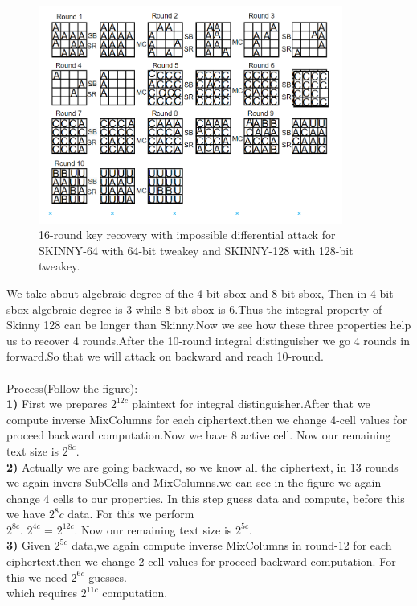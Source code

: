 \documentclass[preprint]{transcrypto}
\begin{document}
{\begin{figure}[H]
	\centering
	\caption{16-round key recovery with impossible differential attack for SKINNY-64 with 64-bit tweakey and SKINNY-128 with 128-bit tweakey.}
	\includegraphics[width=10cm]{fig5.png}
\end{figure}
We take about algebraic degree of the 4-bit sbox and 8 bit sbox, Then in 4 bit sbox algebraic
degree is 3 while 8 bit sbox is 6.Thus the integral property of Skinny 128 can be longer than
Skinny.Now we see how these three properties help us to recover 4 rounds.After the 10-round
integral distinguisher we go 4 rounds in forward.So that we will attack on backward and reach
10-round.\\ \\
Process(Follow the figure):-\\
\textbf{1)} First we prepares $2^{12c}$ plaintext for integral distinguisher.After that we compute inverse
MixColumns for each ciphertext.then we change 4-cell values for proceed backward
computation.Now we have 8 active cell. Now our remaining text size is $2^{8c}$.\\
\textbf{2)} Actually we are going backward, so we know all the ciphertext, in 13 rounds we again invers
SubCells and MixColumns.we can see in the figure we again change 4 cells to our properties. In
this step guess data and compute, before this we have $2^8c$ data. For this we perform \\$2^{8c}$.
$2^{4c}$ = $2^{12c}$. Now our remaining text size is $2^{5c}$.\\
\textbf{3)} Given $2^{5c}$ data,we again compute inverse MixColumns in round-12 for each ciphertext.then
we change 2-cell values for proceed backward computation. For this we need $2^{6c}$ guesses.\\
which requires $2^{11c}$ computation.\\
}
\end{document}
